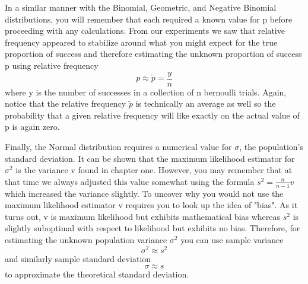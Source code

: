 \documentclass[10pt,]{book}
\numberwithin{equation}{section}
\begin{document}
\par
\hypertarget{p-1268}{}%
In a similar manner with the Binomial, Geometric, and Negative Binomial distributions, you will remember that each required a known value for p before  proceeding with any calculations. From our experiments we saw that relative frequency appeared to stabilize around what you might expect for the true proportion of success and therefore estimating the unknown proportion of success p using relative frequency%
\begin{equation*}
p \approx \tilde{p} = \frac{y}{n}
\end{equation*}
where y is the number of successes in a collection of n bernoulli trials. Again, notice that the relative frequency \(\tilde{p}\) is technically an average as well so the probability that a given relative frequency will like exactly on the actual value of p is again zero.%
\par
\hypertarget{p-1269}{}%
Finally, the Normal distribution requires a numerical value for \(\sigma\), the population's standard deviation. It can be shown that the maximum likelihood estimator for \(\sigma^2\) is the variance v found in chapter one. However, you may remember that at that time we always adjusted this value somewhat using the formula \(s^2 = \frac{n}{n-1} v\) which increased the variance slightly. To uncover why you would not use the maximum likelihood estimator v requires you to look up the idea of "bias". As it turns out, v is maximum likelihood but exhibits mathematical bias whereas \(s^2\) is slightly suboptimal with respect to likelihood but exhibits no bias. Therefore, for estimating the unknown population variance \(\sigma^2\) you can use sample variance%
\begin{equation*}
\sigma^2 \approx s^2
\end{equation*}
and similarly sample standard deviation%
\begin{equation*}
\sigma \approx s
\end{equation*}
to approximate the theoretical standard deviation.%
%
%
\typeout{************************************************}
\typeout{************************************************}
%
\end{document}
